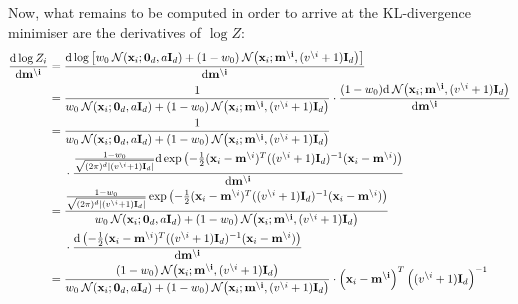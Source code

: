 \documentclass[11pt]{article}
\begin{document}
\bigskip
Now, what remains to be computed in order to arrive at the KL-divergence 
minimiser are the derivatives of $\log Z$:
\begin{align}
\frac{\mathrm{d} \log Z_i}{\mathrm{d} \mathbf{m^{\setminus i}}} &=
			\frac{\mathrm{d} \log\left[ w_0  \:\mathcal{N}(\mathbf{x}_i; \mathbf{0}_d, a\mathbf{I}_{d})
			+  (1 - w_0)\:\mathcal{N}\!\left(\mathbf{x}_i; \mathbf{m^{\setminus i}}, (v^{\setminus i} 
			+ 1)\mathbf{I}_{d}\right)
			\right]}{\mathrm{d} \mathbf{m^{\setminus i}}} \\
			&=
			\frac{1}{w_0  \:\mathcal{N}(\mathbf{x}_i; \mathbf{0}_d, a\mathbf{I}_{d})
			+  (1 - w_0)\:\mathcal{N}\!\left(\mathbf{x}_i; \mathbf{m^{\setminus i}}, (v^{\setminus i} 
			+ 1)\mathbf{I}_{d}\right)
			}\cdot
			\frac{(1 - w_0)\mathrm{d}
			\:\mathcal{N}\!\left(\mathbf{x}_i; \mathbf{m^{\setminus i}}, (v^{\setminus i} 
			+ 1)\mathbf{I}_{d}\right)
			}{\mathrm{d} \mathbf{m^{\setminus i}}} \\
			&=
			\frac{1}{w_0  \:\mathcal{N}(\mathbf{x}_i; \mathbf{0}_d, a\mathbf{I}_{d})
			+  (1 - w_0)\:\mathcal{N}\!\left(\mathbf{x}_i; \mathbf{m^{\setminus i}}, (v^{\setminus i} 
			+ 1)\mathbf{I}_{d}\right)
			}\notag\\
		&\hphantom{=|}\mbox{}
			\cdot
			\frac{
				\frac{1 - w_0}
				{\sqrt{(2\pi)^d|(v^{\setminus i} + 1)\mathbf{I}_d|}}
			\mathrm{d}
			\exp\left(-\frac{1}{2}
				(\mathbf{x}_i - \mathbf{m}^{\setminus i})^T
				((v^{\setminus i} + 1)\mathbf{I}_d)^{-1}
				(\mathbf{x}_i - \mathbf{m}^{\setminus i})\right)}{\mathrm{d} \mathbf{m^{\setminus i}}} \\
			&=
			\frac{\frac{1 - w_0}
				{\sqrt{(2\pi)^d|(v^{\setminus i} + 1)\mathbf{I}_d|}}
			\exp\left(-\frac{1}{2}
				(\mathbf{x}_i - \mathbf{m}^{\setminus i})^T
				((v^{\setminus i} + 1)\mathbf{I}_d)^{-1}
				(\mathbf{x}_i - \mathbf{m}^{\setminus i})\right)
				}
			{w_0  \:\mathcal{N}(\mathbf{x}_i; \mathbf{0}_d, a\mathbf{I}_{d})
			+  (1 - w_0)\:\mathcal{N}\!\left(\mathbf{x}_i; \mathbf{m^{\setminus i}}, (v^{\setminus i} 
			+ 1)\mathbf{I}_{d}\right)
			}\notag\\
		&\hphantom{=|}\mbox{}
			\cdot
			\frac{
			\mathrm{d}
			\left(-\frac{1}{2}
				(\mathbf{x}_i - \mathbf{m}^{\setminus i})^T
				((v^{\setminus i} + 1)\mathbf{I}_d)^{-1}
				(\mathbf{x}_i - \mathbf{m}^{\setminus i})\right)}{\mathrm{d} \mathbf{m^{\setminus i}}} \\
			&=
			\frac{(1 - w_0)
				\:\mathcal{N}\!\left(\mathbf{x}_i; \mathbf{m^{\setminus i}}, (v^{\setminus i} 
							+ 1)\mathbf{I}_{d}\right)
				}
			{w_0  \:\mathcal{N}(\mathbf{x}_i; \mathbf{0}_d, a\mathbf{I}_{d})
			+  (1 - w_0)\:\mathcal{N}\!\left(\mathbf{x}_i; \mathbf{m^{\setminus i}}, (v^{\setminus i} 
			+ 1)\mathbf{I}_{d}\right)
			}
			\cdot
			\left(\mathbf{x}_i - \mathbf{m^{\setminus i}}\right)^T
			\left((v^{\setminus i} + 1)\mathbf{I}_d\right)^{-1}
\end{align}
\end{document}
